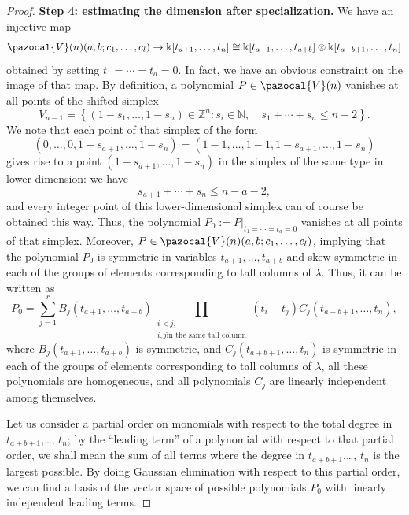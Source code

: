 \documentclass[11pt,reqno]{amsart}
\theoremstyle{plain}
\theoremstyle{definition}
\theoremstyle{remark}
\newcommand{\bk}{\Bbbk}
\def\calV{\pazocal{V}}
\begin{document}
\begin{proof}
\textbf{Step 4: estimating the dimension after specialization. }
We have an injective map
 \[
\calV(n)(a,b;c_1,\ldots,c_l)\to\bk[t_{a+1},\ldots,t_n]\cong \bk[t_{a+1},\ldots,t_{a+b}]\otimes \bk[t_{a+b+1},\ldots,t_n]   
 \]
obtained by setting $t_1=\cdots=t_a=0$.  In fact, we have an obvious constraint on the image of that map. By definition, a polynomial $P\in \calV(n)$ vanishes at all points of the shifted simplex
 \[
V_{n-1}=\left\{
(1-s_1,\ldots,1-s_n)\in\mathbb{Z}^n\colon 
s_i\in\mathbb{N},\quad s_1+\cdots+s_n\le n-2
\right\}. 
 \]
We note that each point of that simplex of the form
 \[
(0,\ldots,0,1-s_{a+1},\ldots,1-s_n)=(1-1,\ldots,1-1,1-s_{a+1},\ldots,1-s_n)
 \]
gives rise to a point $(1-s_{a+1},\ldots,1-s_n)$ in the simplex of the same type in lower dimension: we have 
 \[
s_{a+1}+\cdots+s_n\le n-a-2,     
 \]
and every integer point of this lower-dimensional simplex can of course be obtained this way. Thus, the polynomial $P_0:=P|_{t_1=\cdots=t_a=0}$ vanishes at all points of that simplex. Moreover, $P\in \calV(n)(a,b;c_1,\ldots,c_l)$, implying that the polynomial $P_0$ is symmetric in variables $t_{a+1},\ldots,t_{a+b}$ and skew-symmetric in each of the groups of elements corresponding to tall columns of $\lambda$. Thus, it can be written as 
 \[
P_0=\sum_{j=1}^r B_j(t_{a+1},\ldots,t_{a+b}) \prod_{\substack{i<j,\\i,j \text{in the same tall column}}}(t_i-t_j) C_j(t_{a+b+1},\ldots,t_n),
 \]
where $B_j(t_{a+1},\ldots,t_{a+b})$ is symmetric, and $C_j(t_{a+b+1},\ldots,t_n)$ is symmetric in each of the groups of elements corresponding to tall columns of $\lambda$, all these polynomials are homogeneous, and all polynomials $C_j$ are linearly independent among themselves. 

Let us consider a partial order on monomials with respect to the total degree in $t_{a+b+1}$,\ldots, $t_n$; by the ``leading term'' of a polynomial with respect to that partial order, we shall mean the sum of all terms where the degree in $t_{a+b+1}$,\ldots, $t_n$ is the largest possible. By doing Gaussian elimination with respect to this partial order, we can find a basis of the vector space of possible polynomials $P_0$ with linearly independent leading terms. 


\end{proof}
\end{document}
